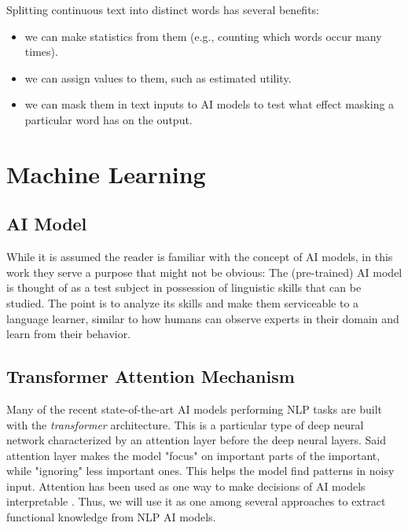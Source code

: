 Splitting continuous text into distinct words has several benefits:
\begin{itemize}
	\item we can make statistics from them (e.g., counting which words occur many times).
	\item we can assign values to them, such as estimated utility.
	\item we can mask them in text inputs to AI models to test what effect masking a particular word has on the output.
\end{itemize}
\section{Machine Learning}
\subsection {AI Model}
While it is assumed the reader is familiar with the concept of AI models, in this work they serve a purpose that might not be obvious:
The (pre-trained) AI model is thought of as a test subject in possession of linguistic skills that can be studied.
The point is to analyze its skills and make them serviceable to a language learner, similar to how humans can observe experts in their domain and learn from their behavior.


\subsection{Transformer Attention Mechanism}
Many of the recent state-of-the-art AI models performing NLP tasks are built with the \textit{transformer} architecture.
This is a particular type of deep neural network characterized by an attention layer before the deep neural layers.
Said attention layer makes the model "focus" on important parts of the important, while "ignoring" less important ones.
This helps the model find patterns in noisy input.
Attention has been used as one way to make decisions of AI models interpretable  .
Thus, we will use it as one among several approaches to extract functional knowledge from NLP AI models.

